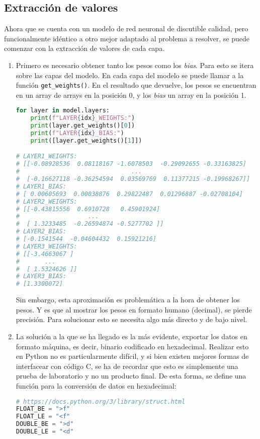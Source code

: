 \subsection{Extracción de valores}
\label{ssec:extraccion_valores}
Ahora que se cuenta con un modelo de red neuronal de discutible calidad, pero funcionalmente idéntico a otro mejor adaptado al problema a resolver, se puede comenzar con la extracción de valores de cada capa.

\begin{enumerate}
    \item Primero es necesario obtener tanto los pesos como los \textit{bias}. Para esto se itera sobre las capas del modelo. En cada capa del modelo se puede llamar a la función \texttt{get\_weights()}. En el resultado que devuelve, los pesos se encuentran en un array de arrays en la posición 0, y los \textit{bias} un array en la posición 1.\medskip
\begin{lstlisting}[language=Python]
for layer in model.layers:
    print(f"LAYER{idx}_WEIGHTS:")
    print(layer.get_weights()[0])
    print(f"LAYER{idx}_BIAS:")
    print([layer.get_weights()[1]])

# LAYER1_WEIGHTS:
# [[-0.08928536  0.08118167 -1.6078503  -0.29092655 -0.33163825]
#                               ...
#  [-0.16627118 -0.36254594  0.03569769  0.11377215 -0.19968267]]
# LAYER1_BIAS:
# [ 0.00605693  0.00038876  0.29822487  0.01296887 -0.02708104]
# LAYER2_WEIGHTS:
# [[-0.43815556  0.6910728   0.45901924]
#                   ...
#  [ 1.3233485  -0.26594874 -0.5277702 ]]
# LAYER2_BIAS:
# [-0.1541544  -0.04604432  0.15921216]
# LAYER3_WEIGHTS:
# [[-3.4663067 ]
#       ...
#  [ 1.5324626 ]]
# LAYER3_BIAS:
# [1.3300072]
\end{lstlisting}
    Sin embargo, esta aproximación es problemática a la hora de obtener los pesos. Y es que al mostrar los pesos en formato humano (decimal), se pierde precisión. Para solucionar esto se necesita algo más directo y de bajo nivel.
    
    \item La solución a la que se ha llegado es la más evidente, exportar los datos en formato máquina, es decir, binario codificado en hexadecimal. Realizar esto en Python no es particularmente difícil, y si bien existen mejores formas de interfacear con código C, se ha de recordar que esto es simplemente una prueba de laboratorio y no un producto final. De esta forma, se define una función para la conversión de datos en hexadecimal:\medskip
\begin{lstlisting}[language=Python]
# https://docs.python.org/3/library/struct.html
FLOAT_BE = ">f"
FLOAT_LE = "<f"
DOUBLE_BE = ">d"
DOUBLE_LE = "<d"


\end{lstlisting}
\end{enumerate}
